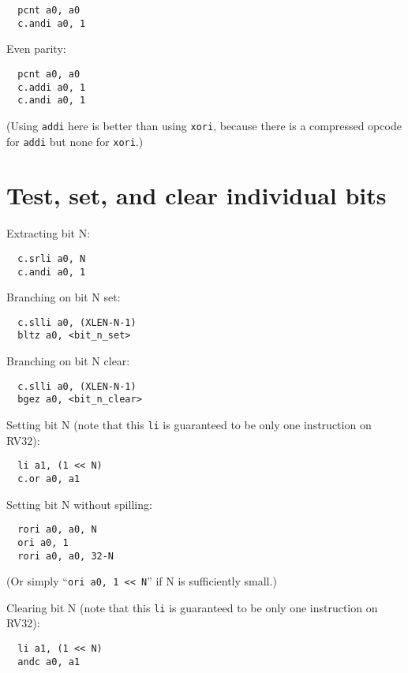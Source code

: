 \begin{verbatim}
  pcnt a0, a0
  c.andi a0, 1
\end{verbatim}

Even parity:

\begin{verbatim}
  pcnt a0, a0
  c.addi a0, 1
  c.andi a0, 1
\end{verbatim}

(Using {\tt addi} here is better than using {\tt xori}, because there is
a compressed opcode for {\tt addi} but none for {\tt xori}.)

\section{Test, set, and clear individual bits}

Extracting bit N:

\begin{verbatim}
  c.srli a0, N
  c.andi a0, 1
\end{verbatim}

Branching on bit N set:

\begin{verbatim}
  c.slli a0, (XLEN-N-1)
  bltz a0, <bit_n_set>
\end{verbatim}

Branching on bit N clear:

\begin{verbatim}
  c.slli a0, (XLEN-N-1)
  bgez a0, <bit_n_clear>
\end{verbatim}

Setting bit N (note that this {\tt li} is guaranteed to be only one instruction on RV32):

\begin{verbatim}
  li a1, (1 << N)
  c.or a0, a1
\end{verbatim}

Setting bit N without spilling:

\begin{verbatim}
  rori a0, a0, N
  ori a0, 1
  rori a0, a0, 32-N
\end{verbatim}

(Or simply ``{\tt ori a0, 1 << N}'' if N is sufficiently small.)

Clearing bit N (note that this {\tt li} is guaranteed to be only one instruction on RV32):

\begin{verbatim}
  li a1, (1 << N)
  andc a0, a1
\end{verbatim}

